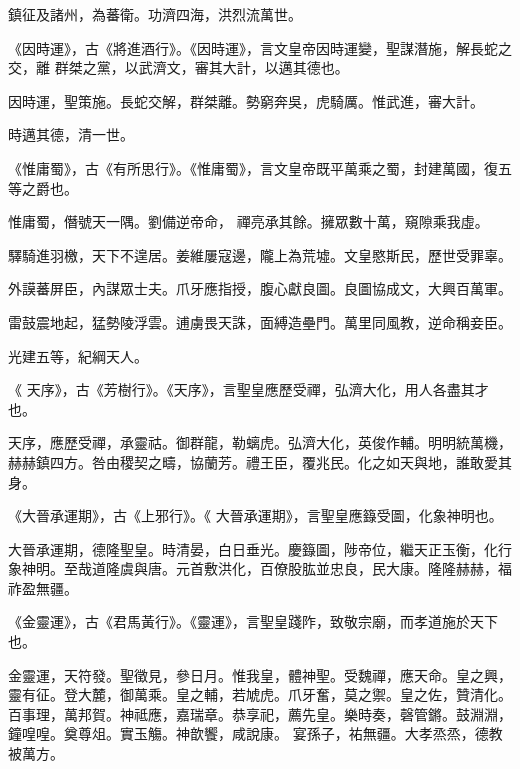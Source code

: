 \begin{pinyinscope}
 鎮征及諸州，為蕃衛。功濟四海，洪烈流萬世。



 《因時運》，古《將進酒行》。《因時運》，言文皇帝因時運變，聖謀潛施，解長蛇之交，離
 群桀之黨，以武濟文，審其大計，以邁其德也。



 因時運，聖策施。長蛇交解，群桀離。勢窮奔吳，虎騎厲。惟武進，審大計。



 時邁其德，清一世。



 《惟庸蜀》，古《有所思行》。《惟庸蜀》，言文皇帝既平萬乘之蜀，封建萬國，復五等之爵也。



 惟庸蜀，僭號天一隅。劉備逆帝命，
 禪亮承其餘。擁眾數十萬，窺隙乘我虛。



 驛騎進羽檄，天下不遑居。姜維屢寇邊，隴上為荒墟。文皇愍斯民，歷世受罪辜。



 外謨蕃屏臣，內謀眾士夫。爪牙應指授，腹心獻良圖。良圖協成文，大興百萬軍。



 雷鼓震地起，猛勢陵浮雲。逋虜畏天誅，面縛造壘門。萬里同風教，逆命稱妾臣。



 光建五等，紀綱天人。



 《
 天序》，古《芳樹行》。《天序》，言聖皇應歷受禪，弘濟大化，用人各盡其才也。



 天序，應歷受禪，承靈祜。御群龍，勒螭虎。弘濟大化，英俊作輔。明明統萬機，赫赫鎮四方。咎由稷契之疇，協蘭芳。禮王臣，覆兆民。化之如天與地，誰敢愛其身。



 《大晉承運期》，古《上邪行》。《
 大晉承運期》，言聖皇應籙受圖，化象神明也。



 大晉承運期，德隆聖皇。時清晏，白日垂光。慶籙圖，陟帝位，繼天正玉衡，化行象神明。至哉道隆虞與唐。元首敷洪化，百僚股肱並忠良，民大康。隆隆赫赫，福祚盈無疆。



 《金靈運》，古《君馬黃行》。《靈運》，言聖皇踐阼，致敬宗廟，而孝道施於天下也。



 金靈運，天符發。聖徵見，參日月。惟我皇，體神聖。受魏禪，應天命。皇之興，靈有征。登大麓，御萬乘。皇之輔，若虓虎。爪牙奮，莫之禦。皇之佐，贊清化。百事理，萬邦賀。神祗應，嘉瑞章。恭享祀，薦先皇。樂時奏，磬管鏘。鼓淵淵，鐘喤喤。奠尊俎。實玉觴。神歆饗，咸說康。
 宴孫子，祐無疆。大孝烝烝，德教被萬方。




\end{pinyinscope}
